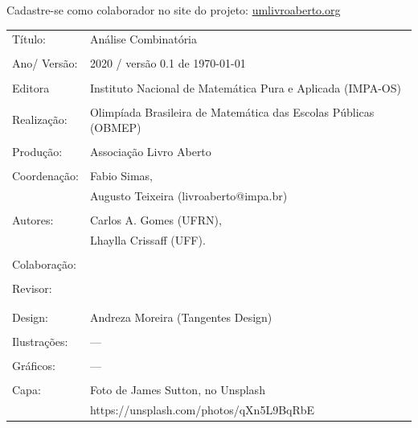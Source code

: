 Cadastre-se como colaborador no site do projeto: \url{umlivroaberto.org}




\begin{tabular}{p{}p{}}
Título: & Análise Combinatória\\
\\
Ano/ Versão: & 2020 / versão 0.1 de \today\\
\\
Editora & Instituto Nacional de Matem\'atica Pura e Aplicada (IMPA-OS)\\
\\
Realização:& Olimp\'iada Brasileira de Matem\'atica das Escolas P\'ublicas (OBMEP)\\
\\
Produção:& Associação Livro Aberto\\
\\
Coordenação: & Fabio Simas, \\
			&  Augusto Teixeira (livroaberto@impa.br)\\
\\
  Autores: & Carlos A. Gomes (UFRN),\\
             & Lhaylla Crissaff (UFF).\\
        
\\
Colaboração: & \\
\\
Revisor: &  \\
         &  \\
\\
Design: & Andreza Moreira (Tangentes Design) \\
\\
  Ilustrações: & --- \\ 
\\
Gráficos: & ---\\
\\
  Capa: & Foto de James Sutton, no Unsplash \\
  		& https://unsplash.com/photos/qXn5L9BqRbE \\

\end{tabular}
\vspace{.5cm}



